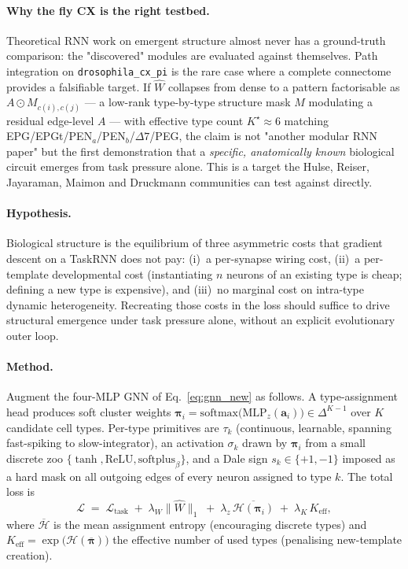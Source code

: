 \documentclass[11pt]{article}
\begin{document}
\paragraph{Why the fly CX is the right testbed.} Theoretical RNN work
on emergent structure almost never has a ground-truth comparison: the
"discovered" modules are evaluated against themselves. Path integration
on \texttt{drosophila\_cx\_pi} is the rare case where a complete
connectome \citep{hulse2021} provides a falsifiable target. If $\hat{W}$
collapses from dense to a pattern factorisable as
$A \odot M_{c(i),c(j)}$ --- a low-rank type-by-type structure mask
$M$ modulating a residual edge-level $A$ --- with effective type
count $K^\star\!\approx\!6$ matching EPG/EPGt/PEN$_a$/PEN$_b$/$\Delta 7$/PEG,
the claim is not "another modular RNN paper" but the first demonstration
that a \emph{specific, anatomically known} biological circuit emerges
from task pressure alone. This is a target the Hulse, Reiser, Jayaraman,
Maimon and Druckmann communities can test against directly.

\paragraph{Hypothesis.} Biological structure is the equilibrium of
three asymmetric costs that gradient descent on a TaskRNN does not
pay: (i)~a per-synapse wiring cost, (ii)~a per-template developmental
cost (instantiating $n$ neurons of an existing type is cheap; defining
a new type is expensive), and (iii)~no marginal cost on intra-type
dynamic heterogeneity. Recreating those costs in the loss should
suffice to drive structural emergence under task pressure alone,
without an explicit evolutionary outer loop.

\paragraph{Method.} Augment the four-MLP GNN of Eq.~\ref{eq:gnn_new}
as follows. A type-assignment head produces soft cluster weights
$\boldsymbol{\pi}_i = \mathrm{softmax}\bigl(\mathrm{MLP}_z(\mathbf{a}_i)\bigr)
\in \Delta^{K-1}$ over $K$ candidate cell types. Per-type primitives are
$\tau_k$ (continuous, learnable, spanning fast-spiking to slow-integrator),
an activation $\sigma_k$ drawn by $\boldsymbol{\pi}_i$ from a small
discrete zoo $\{\tanh,\mathrm{ReLU},\mathrm{softplus}_\beta\}$, and a
Dale sign $s_k\!\in\!\{+1,-1\}$ imposed as a hard mask on all outgoing
edges of every neuron assigned to type $k$. The total loss is
\begin{equation}
\mathcal{L} \;=\; \mathcal{L}_{\text{task}}
\;+\; \lambda_W \|\hat{W}\|_1
\;+\; \lambda_z\,\overline{\mathcal{H}(\boldsymbol{\pi}_i)}
\;+\; \lambda_K\,K_{\text{eff}},
\end{equation}
where $\overline{\mathcal{H}}$ is the mean assignment entropy
(encouraging discrete types) and $K_{\text{eff}} = \exp\bigl(\mathcal{H}(\overline{\boldsymbol{\pi}})\bigr)$
the effective number of used types (penalising new-template creation).
\end{document}
